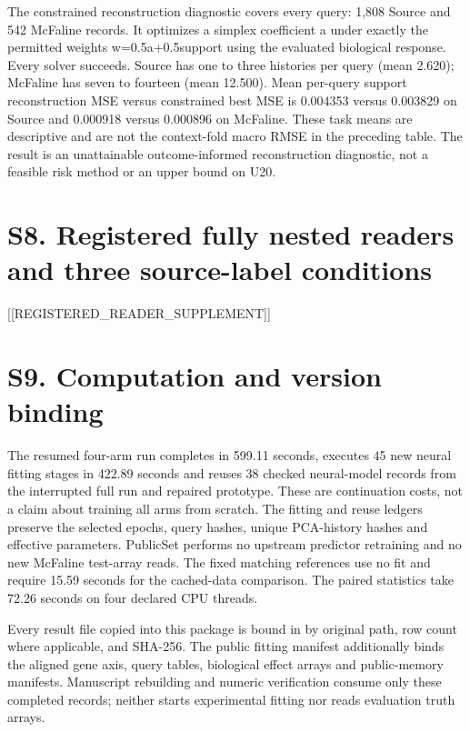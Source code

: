 \documentclass[journal,onecolumn]{IEEEtran}
\begin{document}
The constrained reconstruction diagnostic covers every query: 1,808 Source and 542 McFaline records. It optimizes a simplex coefficient a under exactly the permitted weights w=0.5a+0.5support using the evaluated biological response. Every solver succeeds. Source has one to three histories per query (mean 2.620); McFaline has seven to fourteen (mean 12.500). Mean per-query support reconstruction MSE versus constrained best MSE is 0.004353 versus 0.003829 on Source and 0.000918 versus 0.000896 on McFaline. These task means are descriptive and are not the context-fold macro RMSE in the preceding table. The result is an unattainable outcome-informed reconstruction diagnostic, not a feasible risk method or an upper bound on U20.


\section{S8. Registered fully nested readers and three source-label conditions}

[[REGISTERED\_READER\_SUPPLEMENT]]


\section{S9. Computation and version binding}

The resumed four-arm run completes in 599.11 seconds, executes 45 new neural fitting stages in 422.89 seconds and reuses 38 checked neural-model records from the interrupted full run and repaired prototype. These are continuation costs, not a claim about training all arms from scratch. The fitting and reuse ledgers preserve the selected epochs, query hashes, unique PCA-history hashes and effective parameters. PublicSet performs no upstream predictor retraining and no new McFaline test-array reads. The fixed matching references use no fit and require 15.59 seconds for the cached-data comparison. The paired statistics take 72.26 seconds on four declared CPU threads.


Every result file copied into this package is bound in \texttt{} by original path, row count where applicable, and SHA-256. The public fitting manifest additionally binds the aligned gene axis, query tables, biological effect arrays and public-memory manifests. Manuscript rebuilding and numeric verification consume only these completed records; neither starts experimental fitting nor reads evaluation truth arrays.
\end{document}
